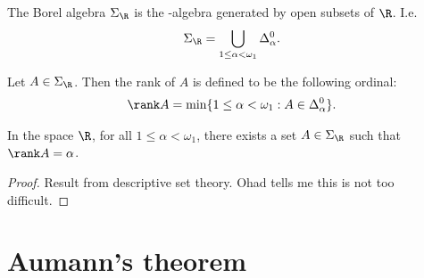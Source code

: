 \documentclass{article}
\begin{document}
\begin{definition}
	The Borel algebra $\Sigma_\R$ is the \sigma-algebra generated by open subsets of $\R$. I.e.
	\begin{align*}
		\Sigma_\R = \bigcup_{1\leq\alpha<\omega_1}\Delta_\alpha^0.
	\end{align*}
\end{definition}

\begin{definition}[Rank]
	Let $A\in\Sigma_\R$. Then the rank of $A$ is defined to be the following ordinal:
	\begin{align*}
		\rank A = \min\{1\leq\alpha<\omega_1:A\in\Delta_\alpha^0\}.
	\end{align*}
\end{definition}

\begin{proposition}
	\label{borelcap}
	In the space $\R$, for all $1\leq\alpha<\omega_1$, there exists a set $A\in\Sigma_\R$
	such that $\rank A=\alpha$.
	\begin{proof}
		Result from descriptive set theory. Ohad tells me this is not too difficult.
	\end{proof}
\end{proposition}

\section{Aumann's theorem}
\end{document}
